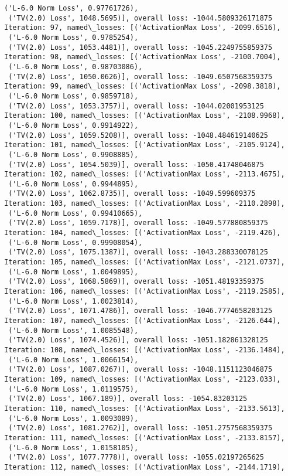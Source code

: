 \documentclass[10pt]{article}
\begin{document}
\begin{Verbatim}[commandchars=\\\{\}]
 ('L-6.0 Norm Loss', 0.97761726),
 ('TV(2.0) Loss', 1048.5695)], overall loss: -1044.5809326171875
Iteration: 97, named\_losses: [('ActivationMax Loss', -2099.6516),
 ('L-6.0 Norm Loss', 0.9785254),
 ('TV(2.0) Loss', 1053.4481)], overall loss: -1045.2249755859375
Iteration: 98, named\_losses: [('ActivationMax Loss', -2100.7004),
 ('L-6.0 Norm Loss', 0.98703086),
 ('TV(2.0) Loss', 1050.0626)], overall loss: -1049.6507568359375
Iteration: 99, named\_losses: [('ActivationMax Loss', -2098.3818),
 ('L-6.0 Norm Loss', 0.9859718),
 ('TV(2.0) Loss', 1053.3757)], overall loss: -1044.02001953125
Iteration: 100, named\_losses: [('ActivationMax Loss', -2108.9968),
 ('L-6.0 Norm Loss', 0.9914922),
 ('TV(2.0) Loss', 1059.5208)], overall loss: -1048.484619140625
Iteration: 101, named\_losses: [('ActivationMax Loss', -2105.9124),
 ('L-6.0 Norm Loss', 0.9908885),
 ('TV(2.0) Loss', 1054.5039)], overall loss: -1050.41748046875
Iteration: 102, named\_losses: [('ActivationMax Loss', -2113.4675),
 ('L-6.0 Norm Loss', 0.9944895),
 ('TV(2.0) Loss', 1062.8735)], overall loss: -1049.599609375
Iteration: 103, named\_losses: [('ActivationMax Loss', -2110.2898),
 ('L-6.0 Norm Loss', 0.99410665),
 ('TV(2.0) Loss', 1059.7178)], overall loss: -1049.577880859375
Iteration: 104, named\_losses: [('ActivationMax Loss', -2119.426),
 ('L-6.0 Norm Loss', 0.99908054),
 ('TV(2.0) Loss', 1075.1387)], overall loss: -1043.288330078125
Iteration: 105, named\_losses: [('ActivationMax Loss', -2121.0737),
 ('L-6.0 Norm Loss', 1.0049895),
 ('TV(2.0) Loss', 1068.5869)], overall loss: -1051.48193359375
Iteration: 106, named\_losses: [('ActivationMax Loss', -2119.2585),
 ('L-6.0 Norm Loss', 1.0023814),
 ('TV(2.0) Loss', 1071.4786)], overall loss: -1046.7774658203125
Iteration: 107, named\_losses: [('ActivationMax Loss', -2126.644),
 ('L-6.0 Norm Loss', 1.0085548),
 ('TV(2.0) Loss', 1074.4526)], overall loss: -1051.182861328125
Iteration: 108, named\_losses: [('ActivationMax Loss', -2136.1484),
 ('L-6.0 Norm Loss', 1.0066154),
 ('TV(2.0) Loss', 1087.0267)], overall loss: -1048.1151123046875
Iteration: 109, named\_losses: [('ActivationMax Loss', -2123.033),
 ('L-6.0 Norm Loss', 1.0119575),
 ('TV(2.0) Loss', 1067.189)], overall loss: -1054.83203125
Iteration: 110, named\_losses: [('ActivationMax Loss', -2133.5613),
 ('L-6.0 Norm Loss', 1.0093089),
 ('TV(2.0) Loss', 1081.2762)], overall loss: -1051.2757568359375
Iteration: 111, named\_losses: [('ActivationMax Loss', -2133.8157),
 ('L-6.0 Norm Loss', 1.0158105),
 ('TV(2.0) Loss', 1077.7778)], overall loss: -1055.02197265625
Iteration: 112, named\_losses: [('ActivationMax Loss', -2144.1719),

\end{Verbatim}
\end{document}
